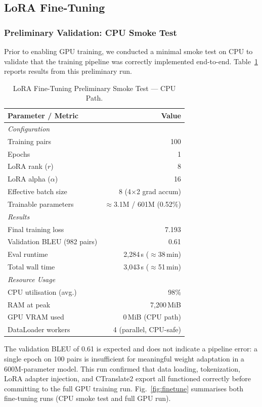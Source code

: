 \documentclass[conference]{IEEEtran}
\begin{document}
\subsection{LoRA Fine-Tuning}
\label{sec:lora_ft}

\subsubsection{Preliminary Validation: CPU Smoke Test}

Prior to enabling GPU training, we conducted a minimal smoke test on CPU to
validate that the training pipeline was correctly implemented end-to-end.
Table~\ref{tab:finetune_cpu} reports results from this preliminary run.

\begin{table}[htbp]
\caption{LoRA Fine-Tuning Preliminary Smoke Test --- CPU Path.}
\label{tab:finetune_cpu}
\centering
\begin{tabular}{lr}
\toprule
Parameter / Metric & Value \\
\midrule
\multicolumn{2}{l}{\textit{Configuration}} \\
Training pairs & 100 \\
Epochs & 1 \\
LoRA rank ($r$) & 8 \\
LoRA alpha ($\alpha$) & 16 \\
Effective batch size & 8 (4$\times$2 grad accum) \\
Trainable parameters & $\approx$3.1M / 601M (0.52\%) \\
\midrule
\multicolumn{2}{l}{\textit{Results}} \\
Final training loss & 7.193 \\
Validation BLEU (982 pairs) & 0.61 \\
Eval runtime & 2{,}284\,s ($\approx$38\,min) \\
Total wall time & 3{,}043\,s ($\approx$51\,min) \\
\midrule
\multicolumn{2}{l}{\textit{Resource Usage}} \\
CPU utilisation (avg.) & 98\% \\
RAM at peak & 7{,}200\,MiB \\
GPU VRAM used & 0\,MiB (CPU path) \\
DataLoader workers & 4 (parallel, CPU-safe) \\
\bottomrule
\end{tabular}
\end{table}

The validation BLEU of 0.61 is expected and does not indicate a pipeline error:
a single epoch on 100 pairs is insufficient for meaningful weight adaptation in a
600M-parameter model. This run confirmed that data loading, tokenization, LoRA
adapter injection, and CTranslate2 export all functioned correctly before
committing to the full GPU training run.
Fig.~\ref{fig:finetune} summarises both fine-tuning runs (CPU smoke test and full GPU run).
\end{document}
